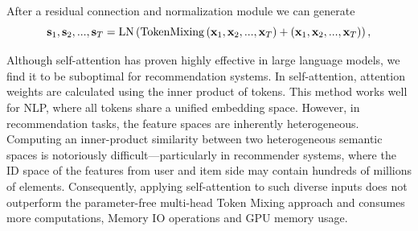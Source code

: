     
    
    After a residual connection and normalization module we can generate
    \begin{equation}
        \mathbf{s}_1, \mathbf{s}_2, ..., \mathbf{s}_T = {\rm LN}\left({\rm TokenMixing} \left( \mathbf{x}_1, \mathbf{x}_2, ..., \mathbf{x}_T \right) + \left( \mathbf{x}_1, \mathbf{x}_2, ..., \mathbf{x}_T \right)\right),
    \end{equation}
    
    Although self-attention has proven highly effective in large language models, we find it to be suboptimal for recommendation systems.
    In self-attention, attention weights are calculated using the inner product of tokens. 
    This method works well for NLP, where all tokens share a unified embedding space. 
    However, in recommendation tasks, the feature spaces are inherently heterogeneous.
    Computing an inner-product similarity between two heterogeneous semantic spaces is notoriously difficult—particularly in recommender systems, where the ID space of the features from user and item side may contain hundreds of millions of elements.
    Consequently, applying self-attention to such diverse inputs does not outperform the parameter-free multi-head Token Mixing approach and consumes more computations, Memory IO operations and GPU memory usage.
    
